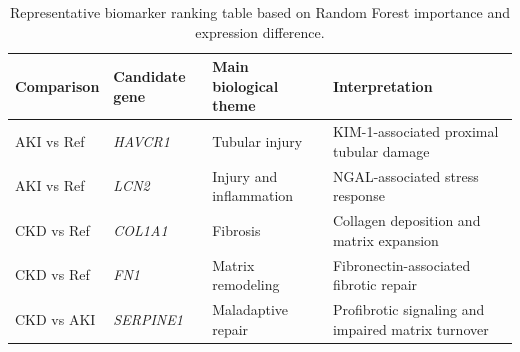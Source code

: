 \begin{table}[H]
\centering
\caption{Representative biomarker ranking table based on Random Forest importance and expression difference.}
\label{tab:biomarker_rankings}
\begin{tabular}{llll}
\toprule
Comparison & Candidate gene & Main biological theme & Interpretation \\
\midrule
AKI vs Ref & \textit{HAVCR1} & Tubular injury & KIM-1-associated proximal tubular damage \\
AKI vs Ref & \textit{LCN2} & Injury and inflammation & NGAL-associated stress response \\
CKD vs Ref & \textit{COL1A1} & Fibrosis & Collagen deposition and matrix expansion \\
CKD vs Ref & \textit{FN1} & Matrix remodeling & Fibronectin-associated fibrotic repair \\
CKD vs AKI & \textit{SERPINE1} & Maladaptive repair & Profibrotic signaling and impaired matrix turnover \\
\bottomrule
\end{tabular}
\end{table}
